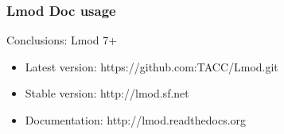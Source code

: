 \documentclass{beamer}
\begin{document}
\begin{frame}[fragile]
    \frametitle{Lmod Doc usage}
\end{frame}


\begin{frame}{Conclusions: Lmod 7+}
  \begin{itemize}
    \item Latest version: https://github.com:TACC/Lmod.git
    \item Stable version: http://lmod.sf.net
    \item Documentation:  http://lmod.readthedocs.org
  \end{itemize}
\end{frame}
\end{document}
